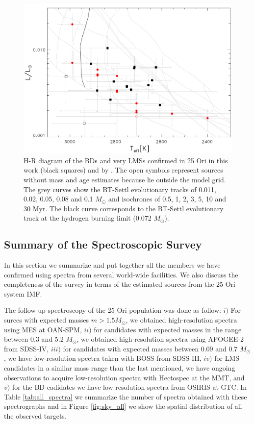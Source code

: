 \documentclass[12pt]{article}
\begin{document}
\begin{figure}[ht!]
	\includegraphics[width=1.0\textwidth]{HR_OSIRIS.pdf}
	\caption[H-R diagram of the so far confirmed members with OSIRIS spectra.]{H-R diagram of the BDs and very LMSs confirmed in 25 Ori in this work (black squares) and by \citet[red circles; ][]{Downes2015}. The open symbols represent sources without mass and age estimates because lie outside the model grid. The grey curves show the BT-Settl evolutionary tracks of 0.011, 0.02, 0.05, 0.08 and 0.1 $M_\odot$ and isochrones of 0.5, 1, 2, 3, 5, 10 and 30 Myr. The black curve corresponds to the BT-Settl evolutionary track at the hydrogen burning limit (0.072 $M_\odot$).}
	\label{fig_OSIRIS:HR}
\end{figure}

\subsection{Summary of the Spectroscopic Survey}
\label{sec:spectra}
In this section we summarize and put together all the members we have confirmed using spectra from several world-wide facilities. We also discuss the completeness of the survey in terms of the estimated sources from the 25 Ori system IMF. 

The follow-up spectroscopy of the 25 Ori population was done as follow: $i)$ For surces with expected masses $m>1.5 M_\odot$, we obtained high-resolution spectra using MES at OAN-SPM, $ii)$ for candidates with expected masses in the range between 0.3 and 5.2 $M_\odot$, we obtained high-resolution spectra using APOGEE-2 from SDSS-IV, $iii)$ for candidates with expected masses between 0.09 and 0.7 $M_\odot$, we have low-resolution spectra taken with BOSS from SDSS-III, $iv)$ for LMS candidates in a similar mass range than the last mentioned, we have ongoing observations to acquire low-resolution spectra with Hectospec at the MMT, and $v)$ for the BD cadidates we have low-resolution spectra from OSIRIS at GTC. In Table \ref{tab:all_spectra} we summarize the number of spectra obtained with these spectrographs and in Figure \ref{fig:sky_all} we show the spatial distribution of all the observed targets.
\end{document}
